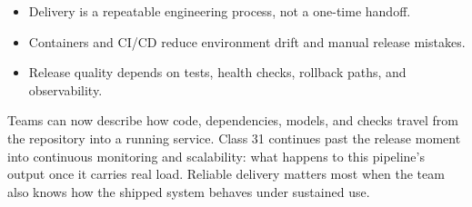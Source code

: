 \classclosingframe
{\begin{itemize}
\item Delivery is a repeatable engineering process, not a one-time handoff.
\item Containers and CI/CD reduce environment drift and manual release mistakes.
\item Release quality depends on tests, health checks, rollback paths, and observability.
\end{itemize}}
{Teams can now describe how code, dependencies, models, and checks travel from the repository into a running service.}
{Class 31 continues past the release moment into continuous monitoring and scalability: what happens to this pipeline's output once it carries real load.}
{Reliable delivery matters most when the team also knows how the shipped system behaves under sustained use.}


